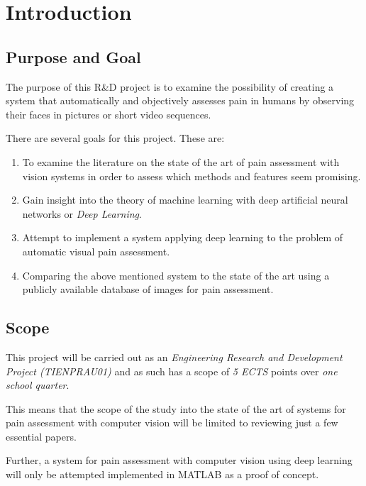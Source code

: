 \documentclass[Main]{subfiles}
\begin{document}
\section{Introduction} %
	\label{sec:introduction}

	\subsection{Purpose and Goal} %
		\label{sub:purpose_and_goal}
		The purpose of this R\&D project is to examine the possibility of creating a system that automatically and objectively  assesses pain in humans by observing their faces in pictures or short video sequences.

		There are several goals for this project.
		These are:
		\begin{enumerate}
			\item 
				To examine the literature on the state of the art of pain assessment with vision systems in order to assess which methods and features seem promising.
			\item
				Gain insight into the theory of machine learning with deep artificial neural networks or \emph{Deep Learning}.
			\item
				Attempt to implement a system applying deep learning to the problem of automatic visual pain assessment.
			\item 
				Comparing the above mentioned system to the state of the art using a publicly available database of images for pain assessment.
		\end{enumerate}


	\subsection{Scope} %
		\label{sub:scope}
		This project will be carried out as an \emph{Engineering Research and Development Project (TIENPRAU01)} and as such has a scope of \emph{5 ECTS} points over \emph{one school quarter}.

		This means that the scope of the study into the state of the art of systems for pain assessment with computer vision will be limited to reviewing just a few essential papers.

		Further, a system for pain assessment with computer vision using deep learning will only be attempted implemented in MATLAB as a proof of concept.


\end{document}
